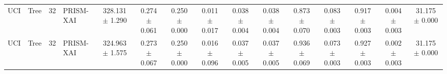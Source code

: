 \begin{table}[t]
\begin{tabular}{llllccccccccccc}
UCI & Tree & 32 & PRISM-XAI & 328.131 $\pm$ 1.290 & 0.274 $\pm$ 0.061 & 0.250 $\pm$ 0.000 & 0.011 $\pm$ 0.017 & 0.038 $\pm$ 0.004 & 0.038 $\pm$ 0.004 & 0.873 $\pm$ 0.070 & 0.083 $\pm$ 0.003 & 0.917 $\pm$ 0.003 & 0.004 $\pm$ 0.003 & 31.175 $\pm$ 0.000 \\
UCI & Tree & 32 & PRISM-XAI & 324.963 $\pm$ 1.575 & 0.273 $\pm$ 0.067 & 0.250 $\pm$ 0.000 & 0.016 $\pm$ 0.096 & 0.037 $\pm$ 0.005 & 0.037 $\pm$ 0.005 & 0.936 $\pm$ 0.069 & 0.073 $\pm$ 0.003 & 0.927 $\pm$ 0.003 & 0.002 $\pm$ 0.003 & 31.175 $\pm$ 0.000 \\
\bottomrule
\end{tabular}
\end{table}
